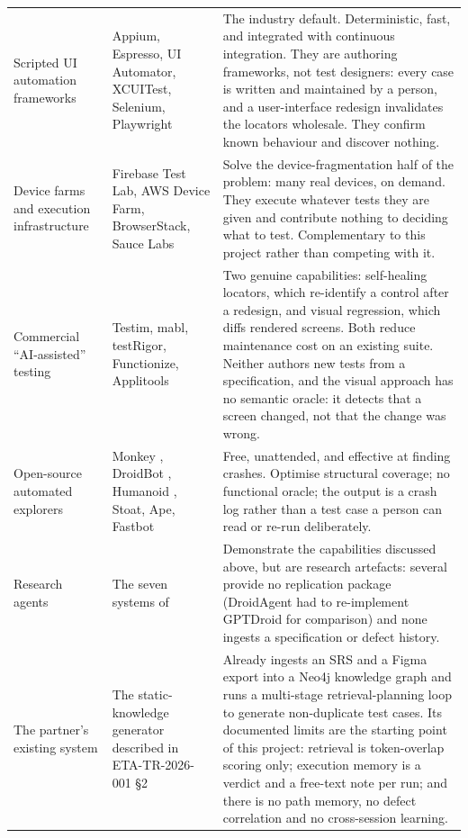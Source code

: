 \begin{xltabular}{\textwidth}{@{}>{\hsize}Y>{\hsize}Y>{\hsize}Y@{}}
  Scripted UI automation frameworks & Appium, Espresso, UI Automator, XCUITest, Selenium, Playwright &
    The industry default. Deterministic, fast, and integrated with continuous integration. They are authoring frameworks, not test designers: every case is written and maintained by a person, and a user-interface redesign invalidates the locators wholesale. They confirm known behaviour and discover nothing. \\
  \addlinespace
  Device farms and execution infrastructure & Firebase Test Lab, AWS Device Farm, BrowserStack, Sauce Labs &
    Solve the device-fragmentation half of the problem: many real devices, on demand. They execute whatever tests they are given and contribute nothing to deciding what to test. Complementary to this project rather than competing with it. \\
  \addlinespace
  Commercial ``AI-assisted'' testing & Testim, mabl, testRigor, Functionize, Applitools &
    Two genuine capabilities: self-healing locators, which re-identify a control after a redesign, and visual regression, which diffs rendered screens. Both reduce maintenance cost on an existing suite. Neither authors new tests from a specification, and the visual approach has no semantic oracle: it detects that a screen changed, not that the change was wrong. \\
  \addlinespace
  Open-source automated explorers & Monkey \cite{monkey}, DroidBot \cite{droidbot}, Humanoid \cite{humanoid}, Stoat, Ape, Fastbot &
    Free, unattended, and effective at finding crashes. Optimise structural coverage; no functional oracle; the output is a crash log rather than a test case a person can read or re-run deliberately. \\
  \addlinespace
  Research agents & The seven systems of  &
    Demonstrate the capabilities discussed above, but are research artefacts: several provide no replication package (DroidAgent had to re-implement GPTDroid for comparison) and none ingests a specification or defect history. \\
  \addlinespace
  The partner's existing system & The static-knowledge generator described in ETA-TR-2026-001 \S2 \cite{etatr} &
    Already ingests an SRS and a Figma export into a Neo4j knowledge graph and runs a multi-stage retrieval-planning loop to generate non-duplicate test cases. Its documented limits are the starting point of this project: retrieval is token-overlap scoring only; execution memory is a verdict and a free-text note per run; and there is no path memory, no defect correlation and no cross-session learning. \\
\end{xltabular}
\endgroup

